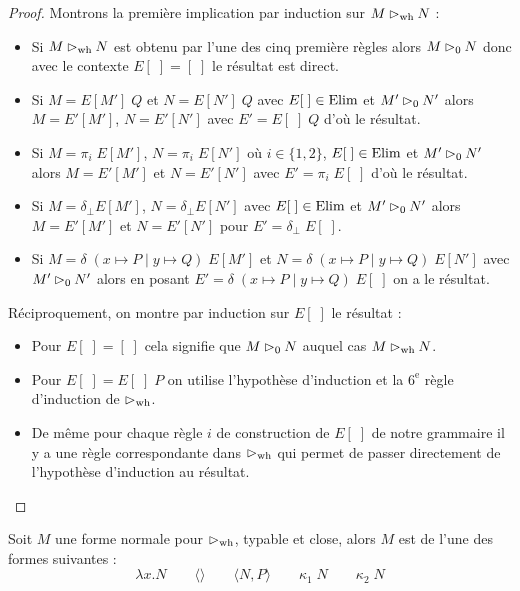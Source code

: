 \begin{proof}
    Montrons la première implication par induction sur $M\rhd_{\mathrm{wh}} N$ :
    \begin{itemize}[label=$\bullet$]
        \item Si $M\rhd_{\mathrm{wh}} N$ est obtenu par l'une des cinq première règles alors $M\rhd_0 N$ donc avec le contexte $E[\;] = [\;]$ le résultat est direct.
        \item Si $M = E[M']\;Q$ et $N = E[N']\;Q$ avec $E[\;]\in\mathrm{Elim}$ et $M'\rhd_0 N'$ alors $M = E'[M']$, $N = E'[N']$ avec $E' = E[\;]\;Q$ d'où le résultat.
        \item Si $M = \pi_i\;E[M']$, $N = \pi_i\;E[N']$ où $i\in\{1,2\}$, $E[\;]\in\mathrm{Elim}$ et $M'\rhd_0 N'$ alors $M = E'[M']$ et $N = E'[N']$ avec $E' = \pi_i\;E[\;]$ d'où le résultat.
        \item Si $M = \delta_\bot E[M']$, $N = \delta_\bot E[N']$ avec $E[\;]\in\mathrm{Elim}$ et $M'\rhd_0 N'$ alors $M = E'[M']$ et $N = E'[N']$ pour $E' = \delta_\bot\;E[\;]$.
        \item Si $M = \delta\;(x\mapsto P\mid y\mapsto Q)\;E[M']$ et $N = \delta\;(x\mapsto P\mid y\mapsto Q)\;E[N']$ avec $M'\rhd_0 N'$ alors en posant $E' = \delta\;(x\mapsto P\mid y\mapsto Q)\;E[\;]$ on a le résultat.
    \end{itemize}

    Réciproquement, on montre par induction sur $E[\;]$ le résultat :
    \begin{itemize}[label=$\bullet$]
        \item Pour $E[\;] = [\;]$ cela signifie que $M\rhd_0 N$ auquel cas $M\rhd_{\mathrm{wh}} N$.
        \item Pour $E[\;] = E[\;]\;P$ on utilise l'hypothèse d'induction et la $6^\mathrm e$ règle d'induction de $\rhd_{\mathrm{wh}}$.
        \item De même pour chaque règle $i$ de construction de $E[\;]$ de notre grammaire il y a une règle correspondante dans $\rhd_{\mathrm{wh}}$ qui permet de passer directement de l'hypothèse d'induction au résultat.
    \end{itemize}
\end{proof}

\begin{prop}
    Soit $M$ une forme normale pour $\rhd_{\mathrm{wh}}$, typable et close, alors $M$ est de l'une des formes suivantes :
    $$\lambda x.N\qquad \langle\rangle\qquad \langle N,P\rangle \qquad \kappa_1\;N\qquad\kappa_2\;N$$
\end{prop}

